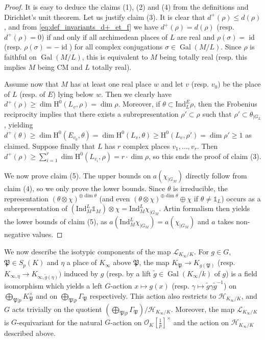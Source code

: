\documentclass[12pt]{amsart}
\newcommand\cH{\mathcal{H}}
\newcommand\cO{\mathcal{O}}
\newcommand\gP{\mathfrak{P}}
\newcommand\sL{\mathscr{L}}
\newcommand{\Ind}{\mathrm{Ind}}
\DeclareMathOperator{\Gal}{Gal}
\DeclareMathOperator{\id}{id}
\newcommand{\HH}{\mathrm{H}}
\theoremstyle{defstyle}
\theoremstyle{thmstyle}
\begin{document}
	\begin{proof}
		It is easy to deduce the claims (1), (2) and (4) from the definitions and Dirichlet's unit theorem. Let us justify claim (3). It is clear that $d^+(\rho)\leq d(\rho)$, and from \eqref{eq:def_invariants_d+_et_f} we have $d^+(\rho)=d(\rho)$ (resp. $d^+(\rho)=0$) if and only if all archimedean places of $L$ are real and $\rho(\sigma)=\id$ (resp. $\rho(\sigma)=-\id$) for all complex conjugations $\sigma \in \Gal(M/L)$. Since $\rho$ is faithful on $\Gal(M/L)$, this is equivalent to $M$ being totally real (resp. this implies $M$ being CM and $L$ totally real). 
		
		Assume now that $M$ has at least one real place $w$ and let $v$ (resp. $v_0$) be the place of $L$ (resp. of $E$) lying below $w$. Then we clearly have $d^+(\rho)\geq \dim\HH^0(L_v,\rho)=\dim\rho$. Moreover, if $\theta \subset \Ind_L^E \rho$, then the Frobenius reciprocity implies that there exists a subrepresentation $\rho' \subset \rho$ such that $\rho' \subset \theta_{|G_L}$, yielding $d^+(\theta)\geq \dim \HH^0(E_{v_0},\theta)=\dim \HH^0(L_v,\theta)\geq \HH^0(L_v,\rho')=\dim \rho'\geq 1$ as claimed. Suppose finally that $L$ has $r$ complex places $v_1,\ldots,v_r$. Then $d^+(\rho)\geq \sum_{i=1}^{r} \dim \HH^0(L_{v_i},\rho)=r\cdot \dim \rho$, so this ends the proof of claim (3).
		
		We now prove claim (5). The upper bounds on $a(\chi_{|G_M})$ directly follow from claim (4), so we only prove the lower bounds. Since $\theta$ is irreducible, the representation $(\theta \otimes \chi)^{\oplus\dim \theta}$ (and even $(\theta \otimes \chi)^{\oplus\dim \theta} \oplus \chi$ if $\theta\neq\mathds{1}_L$)  occurs as a subrepresentation of $(\Ind_M^L \mathds{1}_M)\otimes \chi= \Ind_M^L \chi_{|G_M}$. Artin formalism then yields the lower bounds of claim (5), as $a(\Ind_M^L \chi_{|G_M})=a(\chi_{|G_M})$ and $a$ takes non-negative values.
	\end{proof}
	
	We now describe the isotypic components of the map $\sL_{K_\infty/K}$. For $g\in G$, $\gP\in S_p(K)$ and $\eta$ a place of $K_\infty$ above $\gP$, the map $K_\gP \to  K_{g(\gP)}$ (resp. $K_{\infty,\eta} \to K_{\infty,\tilde{g}(\eta)})$ induced by $g$ (resp. by a lift  $\tilde{g}\in \Gal(K_\infty/k)$ of $g$) is a field isomorphism which yields a left $G$-action $x \mapsto g(x)$ (resp. $\gamma \mapsto \tilde{g}\gamma \tilde{g}^{-1}$) on $\bigoplus_{\gP|p} K_{\gP}^\times$ and on $\bigoplus_{\gP|p} \Gamma_\gP$ respectively. This action also restricts to $\cH_{K_\infty/K}$, and $G$ acts trivially on the quotient $(\bigoplus_{\gP|p} \Gamma_\gP)/\cH_{K_\infty/K}$. Moreover, the map $\sL_{K_\infty/K}$ is $G$-equivariant for the natural $G$-action on $\cO_K[\tfrac{1}{p}]^{\times}$ and the action on $\cH_{K_\infty/K}$ described above.
	
\end{document}
